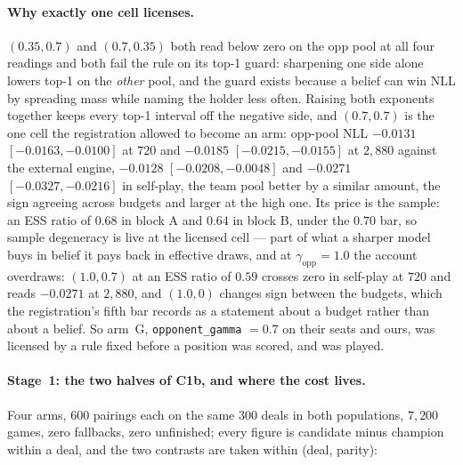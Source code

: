 \documentclass[11pt,letterpaper]{article}
\begin{document}
\paragraph{Why exactly one cell licenses.} $(0.35, 0.7)$ and $(0.7, 0.35)$
both read below zero on the opp pool at all four readings and both fail the
rule on its top-1 guard: sharpening one side alone lowers top-1 on the
\emph{other} pool, and the guard exists because a belief can win NLL by
spreading mass while naming the holder less often. Raising both exponents
together keeps every top-1 interval off the negative side, and $(0.7, 0.7)$ is
the one cell the registration allowed to become an arm: opp-pool NLL
$\mathbf{-0.0131}$ $[-0.0163, -0.0100]$ at $720$ and $\mathbf{-0.0185}$
$[-0.0215, -0.0155]$ at $2{,}880$ against the external engine, $\mathbf{-0.0128}$
$[-0.0208, -0.0048]$ and $\mathbf{-0.0271}$ $[-0.0327, -0.0216]$ in self-play,
the team pool better by a similar amount, the sign agreeing across budgets and
larger at the high one. Its price is the sample: an ESS ratio of
$\mathbf{0.68}$ in block A and $\mathbf{0.64}$ in block B, under the $0.70$
bar, so sample degeneracy is live at the licensed cell --- part of what a
sharper model buys in belief it pays back in effective draws, and at
$\gamma_{\text{opp}} = 1.0$ the account overdraws: $(1.0, 0.7)$ at an ESS
ratio of $0.59$ crosses zero in self-play at $720$ and reads $-0.0271$ at
$2{,}880$, and $(1.0, 0)$ changes sign between the budgets, which the
registration's fifth bar records as a statement about a budget rather than
about a belief. So arm~G, \texttt{opponent\_gamma} $=0.7$ on their seats and
ours, was licensed by a rule fixed before a position was scored, and was
played.
\paragraph{Stage~1: the two halves of C1b, and where the cost lives.} Four
arms, $600$ pairings each on the same $300$ deals in both populations,
$7{,}200$ games, zero fallbacks, zero unfinished; every figure is candidate
minus champion within a deal, and the two contrasts are taken within
(deal, parity):
\end{document}
